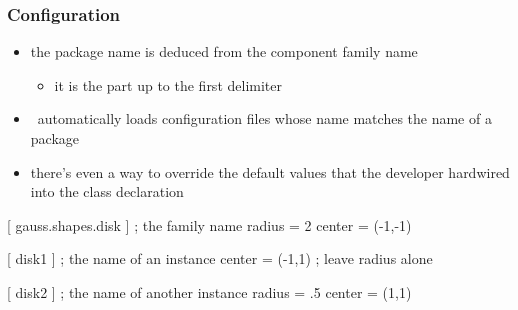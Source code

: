 \begin{frame}[fragile]
%
  \frametitle{Configuration}
%
  \begin{itemize}
  \item the package name is deduced from the component family name
    \begin{itemize}
    \item it is the part up to the first delimiter
    \end{itemize}
  \item \pyre\ automatically loads configuration files whose name matches the name of a package
  \item there's even a way to override the default values that the developer hardwired into
    the class declaration
  \end{itemize}
%
  \begin{icfg}{}
    [ gauss.shapes.disk ] ; the family name
    radius = 2
    center = (-1,-1)

    [ disk1 ] ; the name of an instance
    center = (-1,1)   ; leave {radius} alone

    [ disk2 ] ; the name of another instance
    radius = .5
    center = (1,1)
  \end{icfg}
%
\end{frame}

